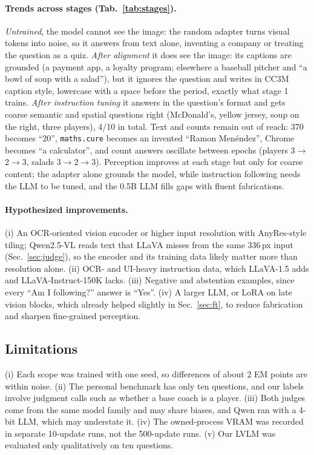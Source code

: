\documentclass[10pt,twocolumn,letterpaper]{article}
\begin{document}
\paragraph{Trends across stages (Tab.~\ref{tab:stages}).} \emph{Untrained}, the model cannot see the image: the random adapter turns visual tokens into noise, so it answers from text alone, inventing a company or treating the question as a quiz. \emph{After alignment} it does see the image: its captions are grounded (a payment app, a loyalty program; elsewhere a baseball pitcher and ``a bowl of soup with a salad''), but it ignores the question and writes in CC3M caption style, lowercase with a space before the period, exactly what stage 1 trains. \emph{After instruction tuning} it answers in the question's format and gets coarse semantic and spatial questions right (McDonald's, yellow jersey, soup on the right, three players), 4/10 in total. Text and counts remain out of reach: 370 becomes ``20'', \texttt{maths.cure} becomes an invented ``Ramon Men\'endez'', Chrome becomes ``a calculator'', and count answers oscillate between epochs (players 3$\to$2$\to$3, salads 3$\to$2$\to$3). Perception improves at each stage but only for coarse content; the adapter alone grounds the model, while instruction following needs the LLM to be tuned, and the 0.5B LLM fills gaps with fluent fabrications.

\paragraph{Hypothesized improvements.} (i) An OCR-oriented vision encoder or higher input resolution with AnyRes-style tiling; Qwen2.5-VL reads text that LLaVA misses from the same 336\,px input (Sec.~\ref{sec:judge}), so the encoder and its training data likely matter more than resolution alone. (ii) OCR- and UI-heavy instruction data, which LLaVA-1.5 adds and LLaVA-Instruct-150K lacks. (iii) Negative and abstention examples, since every ``Am I following?'' answer is ``Yes''. (iv) A larger LLM, or LoRA on late vision blocks, which already helped slightly in Sec.~\ref{sec:ft}, to reduce fabrication and sharpen fine-grained perception.

\subsection{Limitations}

(i) Each scope was trained with one seed, so differences of about 2 EM points are within noise. (ii) The personal benchmark has only ten questions, and our labels involve judgment calls such as whether a base coach is a player. (iii) Both judges come from the same model family and may share biases, and Qwen ran with a 4-bit LLM, which may understate it. (iv) The owned-process VRAM was recorded in separate 10-update runs, not the 500-update runs. (v) Our LVLM was evaluated only qualitatively on ten questions.
\end{document}
